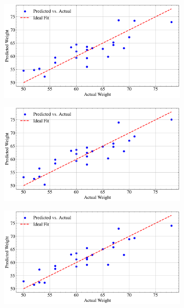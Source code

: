 \begin{figure}
    \centering
    \begin{subfigure}{0.48\linewidth}
        \centering
        \includegraphics[width=\linewidth]{src/figures/polynominal-regression/polynomial_regression-n-1.png}
    \end{subfigure}
    \begin{subfigure}{0.48\linewidth}
        \centering
        \includegraphics[width=\linewidth]{src/figures/polynominal-regression/polynomial_regression-n-2.png}
    \end{subfigure}
    \begin{subfigure}{0.48\linewidth}
        \centering
        \includegraphics[width=\linewidth]{src/figures/polynominal-regression/polynomial_regression-n-3.png}

\end{subfigure}
\end{figure}

